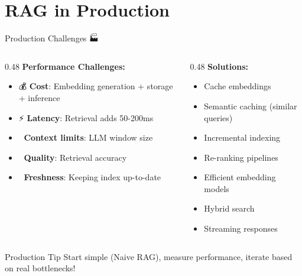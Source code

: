 \documentclass[aspectratio=169]{beamer}
\begin{document}
\section{RAG in Production}

\begin{frame}[shrink=10]{Production Challenges 🏭}
\begin{columns}[T]
\begin{column}{0.48\textwidth}
\textbf{Performance Challenges:}
\begin{itemize}\setlength{\itemsep}{0pt}
    \item 💰 \textbf{Cost}: Embedding generation + storage + inference
    \item ⚡ \textbf{Latency}: Retrieval adds 50-200ms
    \item 📏 \textbf{Context limits}: LLM window size
    \item 🎯 \textbf{Quality}: Retrieval accuracy
    \item 🔄 \textbf{Freshness}: Keeping index up-to-date
\end{itemize}
\end{column}

\begin{column}{0.48\textwidth}
\textbf{Solutions:}
\begin{itemize}\setlength{\itemsep}{0pt}
    \item Cache embeddings
    \item Semantic caching (similar queries)
    \item Incremental indexing
    \item Re-ranking pipelines
    \item Efficient embedding models
    \item Hybrid search
    \item Streaming responses
\end{itemize}
\end{column}
\end{columns}

\vspace{1em}

\begin{alertblock}{Production Tip}
Start simple (Naive RAG), measure performance, iterate based on real bottlenecks!
\end{alertblock}
\end{frame}
\end{document}
